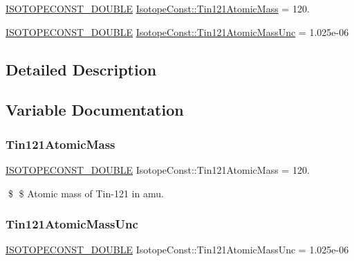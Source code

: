 \begin{DoxyCompactItemize}
\item 
\mbox{\hyperlink{group___isotope_const-_macros_ga8f45a7272ce02c0b4c65c44636ed719a}{I\+S\+O\+T\+O\+P\+E\+C\+O\+N\+S\+T\+\_\+\+D\+O\+U\+B\+LE}} \mbox{\hyperlink{group___isotope_const-_tin-_sn121_ga5ef3d50fa50735269efc7f07bda55ed1}{Isotope\+Const\+::\+Tin121\+Atomic\+Mass}} = 120.
\item 
\mbox{\hyperlink{group___isotope_const-_macros_ga8f45a7272ce02c0b4c65c44636ed719a}{I\+S\+O\+T\+O\+P\+E\+C\+O\+N\+S\+T\+\_\+\+D\+O\+U\+B\+LE}} \mbox{\hyperlink{group___isotope_const-_tin-_sn121_ga625a013adf171b686643861b9dc75057}{Isotope\+Const\+::\+Tin121\+Atomic\+Mass\+Unc}} = 1.\+025e-\/06
\end{DoxyCompactItemize}


\subsection{Detailed Description}


\subsection{Variable Documentation}
\mbox{\label{group___isotope_const-_tin-_sn121_ga5ef3d50fa50735269efc7f07bda55ed1}} 
\subsubsection{\texorpdfstring{Tin121\+Atomic\+Mass}{Tin121AtomicMass}}
{\footnotesize\ttfamily \mbox{\hyperlink{group___isotope_const-_macros_ga8f45a7272ce02c0b4c65c44636ed719a}{I\+S\+O\+T\+O\+P\+E\+C\+O\+N\+S\+T\+\_\+\+D\+O\+U\+B\+LE}} Isotope\+Const\+::\+Tin121\+Atomic\+Mass = 120.}

\$ \$ Atomic mass of Tin-\/121 in amu. \mbox{\label{group___isotope_const-_tin-_sn121_ga625a013adf171b686643861b9dc75057}} 
\subsubsection{\texorpdfstring{Tin121\+Atomic\+Mass\+Unc}{Tin121AtomicMassUnc}}
{\footnotesize\ttfamily \mbox{\hyperlink{group___isotope_const-_macros_ga8f45a7272ce02c0b4c65c44636ed719a}{I\+S\+O\+T\+O\+P\+E\+C\+O\+N\+S\+T\+\_\+\+D\+O\+U\+B\+LE}} Isotope\+Const\+::\+Tin121\+Atomic\+Mass\+Unc = 1.\+025e-\/06}

